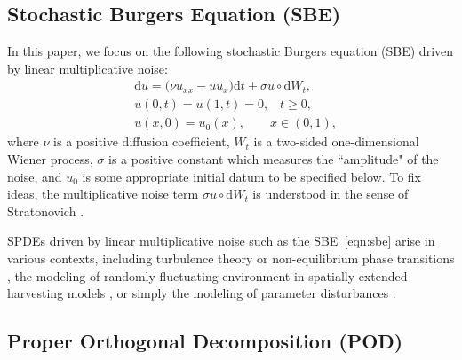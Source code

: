 \documentclass[11pt]{amsart}
\numberwithin{equation}{section}
\def\bea{\begin{equation} \begin{aligned}}
\def\eea{\end{aligned} \end{equation}}
\begin{document}

\subsection{Stochastic Burgers Equation (SBE)}  \label{sec:sbe}
 

In this paper, we focus on the following stochastic Burgers equation (SBE) driven by linear multiplicative noise:
\bea \label{eqn:sbe}
& \mathrm{d} u = \big( \nu u_{xx}  - u  u_x\big) \mathrm{d} t + \sigma u \circ \mathrm{d}W_t, \\
& u(0,t) = u(1,t) = 0, \;\;\; t\geq 0,\\
& u(x, 0) = u_0(x), \qquad x\in (0,1),
\eea
where $\nu$ is a positive diffusion coefficient, $W_t$ is a two-sided one-dimensional Wiener process, $\sigma$ is a positive constant which measures the ``amplitude" of the noise, and $u_0$ is some appropriate initial datum to be specified below.  To fix  ideas, the multiplicative noise term $\sigma u \circ \mathrm{d}W_t$ is understood in the sense of Stratonovich \cite{Oksendal03}.

SPDEs driven by linear multiplicative noise such as the SBE~\eqref{eqn:sbe}  arise in various contexts, including turbulence theory or non-equilibrium phase transitions \cite{Birnir13,Cross_al93,Mun04}, the modeling of randomly fluctuating environment  \cite{BM77} in spatially-extended harvesting models \cite{HSZ02,CR06,RC07,RC10,MMQ11,MMQ08}, or simply the modeling  of parameter disturbances \cite{Blomker07}.



\subsection{Proper Orthogonal Decomposition (POD)}
	\label{sec:pod}
        
\end{document}

